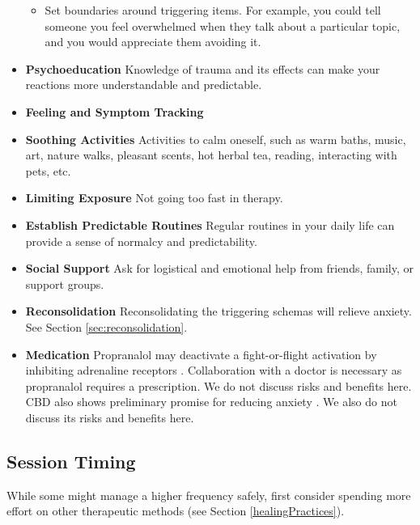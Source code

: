 \documentclass[12pt,letterpaper]{article}
\begin{document}
\begin{itemize}
\begin{itemize}
        \item Set boundaries around triggering items. For example, you could tell someone you feel overwhelmed when they talk about a particular topic, and you would appreciate them avoiding it.
    \end{itemize}
    \item \textbf{Psychoeducation} Knowledge of trauma and its effects can make your reactions more understandable and predictable. 
    \item \textbf{Feeling and Symptom Tracking} 
    \item \textbf{Soothing Activities} Activities to calm oneself, such as warm baths, music, art, nature walks, pleasant scents, hot herbal tea, reading, interacting with pets, etc. 
    \item \textbf{Limiting Exposure} Not going too fast in therapy.  
    \item \textbf{Establish Predictable Routines} Regular routines in your daily life can provide a sense of normalcy and predictability. 
    \item \textbf{Social Support} Ask for logistical and emotional help from friends, family, or support groups. 
    \item \textbf{Reconsolidation} Reconsolidating the triggering schemas will relieve anxiety. See Section \ref{sec:reconsolidation}.
    \item \textbf{Medication} Propranalol may deactivate a fight-or-flight activation by inhibiting adrenaline receptors \cite{steenenPropranalol}. Collaboration with a doctor is necessary as propranalol requires a prescription. We do not discuss risks and benefits here. CBD also shows preliminary promise for reducing anxiety \cite{skelleyCBD}. We also do not discuss its risks and benefits here.
\end{itemize}
\subsection{Session Timing}
While some might manage a higher frequency safely, first consider spending more effort on other therapeutic methods (see Section \ref{healingPractices}). 
\end{document}
